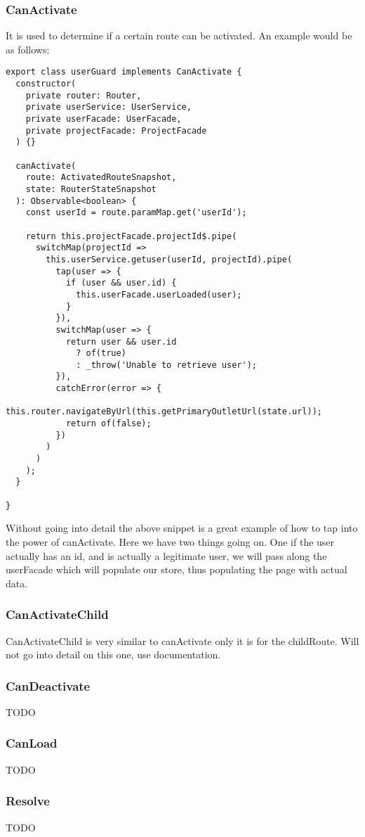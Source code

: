 \subsubsection{ CanActivate }
It is used to determine if a certain route can be activated. An example would
be as follows:
\begin{lstlisting}
export class userGuard implements CanActivate {
  constructor(
    private router: Router,
    private userService: UserService,
    private userFacade: UserFacade,
    private projectFacade: ProjectFacade
  ) {}

  canActivate(
    route: ActivatedRouteSnapshot,
    state: RouterStateSnapshot
  ): Observable<boolean> {
    const userId = route.paramMap.get('userId');

    return this.projectFacade.projectId$.pipe(
      switchMap(projectId =>
        this.userService.getuser(userId, projectId).pipe(
          tap(user => {
            if (user && user.id) {
              this.userFacade.userLoaded(user);
            }
          }),
          switchMap(user => {
            return user && user.id
              ? of(true)
              : _throw('Unable to retrieve user');
          }),
          catchError(error => {
            this.router.navigateByUrl(this.getPrimaryOutletUrl(state.url));
            return of(false);
          })
        )
      )
    );
  }

}
\end{lstlisting}
Without going into detail the above snippet is a great example of how to tap
into the power of canActivate. Here we have two things going on. One if the user
actually has an id, and is actually a legitimate user, we will pass along the
userFacade which will populate our store, thus populating the page with actual
data.

\subsubsection{ CanActivateChild }
CanActivateChild is very similar to canActivate only it is for the childRoute.
Will not go into detail on this one, use documentation.

\subsubsection{ CanDeactivate }
TODO

\subsubsection{ CanLoad }
TODO

\subsubsection{ Resolve }
TODO
